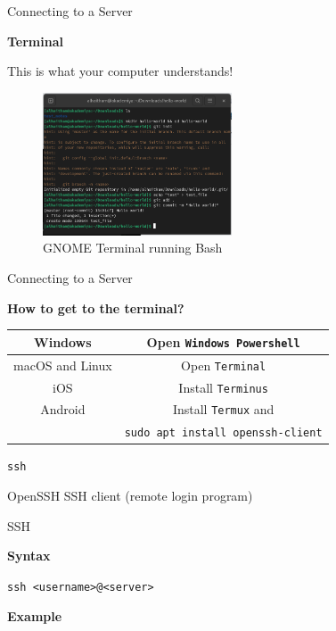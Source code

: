\documentclass{beamer}
\begin{document}
\begin{frame}{Connecting to a Server}
	\begin{Large}
		\textbf{Terminal} \\
	\end{Large}
	This is what your computer understands!
	\begin{figure}
		\centering
		\includegraphics[width=0.5\textwidth]{terminal.png}
		\caption{GNOME Terminal running Bash}
	\end{figure}
\end{frame}

\begin{frame}{Connecting to a Server}
	\begin{Large}
		\textbf{How to get to the terminal?} \\
	\end{Large}
	\begin{tabular}{|c|c|}
		\hline
		Windows & Open \texttt{Windows Powershell} \\
		\hline
		macOS and Linux & Open \texttt{Terminal} \\
		\hline
		iOS & Install \texttt{Terminus} \\
		\hline
		Android & Install \texttt{Termux} and \\
		& \texttt{sudo apt install openssh-client} \\
		\hline
	\end{tabular}
\end{frame}

\begin{frame}
	\begin{center}
		\begin{Huge}
			\texttt{ssh} \\
		\end{Huge}
		OpenSSH SSH client (remote login program)
	\end{center}
\end{frame}

\begin{frame}{SSH}
	\begin{Large}
		\textbf{Syntax} \\
	\end{Large}
	\texttt{ssh <username>@<server>}

	\vspace{0.3cm}

	\begin{Large}
		\textbf{Example} \\
	\end{Large}
	\inputminted{shell-session}{ssh.txt}
\end{frame}
\end{document}
